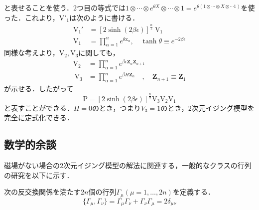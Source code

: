 \documentclass[a4paper,11pt]{jsreport}
\begin{document}
と表せることを使う．2つ目の等式では$1 \otimes \cdots \otimes e^{\theta X} \otimes \cdots \otimes 1 = e^{\theta (1 \otimes \cdots \otimes X \otimes \cdots 1)}$を使った．これより，$\mathrm{V}'_1$は次のように書ける．
\begin{align}
  \mathrm{V}_1'
   & =[2 \sinh (2 \beta \epsilon)]^{\frac{n}{2}} \mathrm{~V}_1                               \\
  \mathrm{V}_1
   & =\prod_{\alpha=1}^n e^{\theta \mathrm{x}_{\alpha}}, \quad \tanh \theta \equiv e^{-2 \beta \epsilon}
\end{align}
同様な考えより，$\mathrm{V}_2, \mathrm{V}_3$に関しても，
\begin{align}
  \mathrm{V}_2
   & =\prod_{\alpha=1}^n e^{\beta \epsilon \mathbf{Z}_\alpha \mathbf{Z}_{\alpha+1}}                      \\
  \mathrm{~V}_3
   & =\prod_{\alpha=1}^n e^{\beta H \mathbf{Z}_\alpha} \quad, \quad \mathbf{Z}_{n+1} \equiv \mathbf{Z}_1
\end{align}
が示せる．したがって
\begin{equation}
  \mathrm{P}
  = [2 \sinh (2 \beta \epsilon)]^{\frac{n}{2}} \mathrm{V}_3 \mathrm{V}_2 \mathrm{V}_1
  \label{行列P最終形態}
\end{equation}
と表すことができる．$H=0$のとき，つまり$V_3 = 1$のとき，2次元イジング模型を完全に定式化できる．

\subsection{数学的余談}
磁場がない場合の2次元イジング模型の解法に関連する，一般的なクラスの行列の研究を以下に示す．\par
次の反交換関係を満たす$2n$個の行列$\Gamma_{\mu} (\mu = 1,\dots,2n)$を定義する．
\begin{equation}
  \{\Gamma_{\mu}, \Gamma_{\nu}\}
  =\Gamma_{\mu} \Gamma_{\nu} + \Gamma_{\nu} \Gamma_{\mu} 
  = 2\delta_{\mu \nu}
  \label{ガンマ反交換}
\end{equation}
\end{document}
